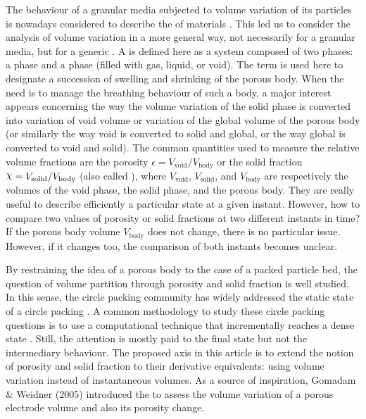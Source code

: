 \documentclass[11pt]{article}
\newcommand{\isay}[1]{\say{\textit{#1}}}
\newcommand{\Vbody}{V_{\text{body}}}
\newcommand{\Vsolid}{V_{\text{solid}}}
\newcommand{\Vvoid}{V_{\text{void}}}
\let\oldchi\chi
\renewcommand{\chi}{\raisebox{0.2ex}{$\oldchi$}}
\begin{document}
The behaviour of a granular media subjected to volume variation of its particles
is nowadays considered to describe the \isay{breathing} of materials
\cite{sassine_study_2018, gillia_hydride_2021, boivin_breathing_2024}. This led
us to consider the analysis of volume variation in a more general way, not
necessarily for a granular media, but for a generic . A
\isay{porous body} is defined here as a system composed of two phases: a
 phase and a  phase (filled with gas, liquid, or void). The
term \isay{breathing} is used here to designate a succession of swelling and
shrinking of the porous body. When the need is to manage the breathing behaviour
of such a body, a major interest appears concerning the way the volume variation
of the solid phase is converted into variation of void volume or variation of
the global volume of the porous body (or similarly the way void is converted to
solid and global, or the way global is converted to void and solid). The common
quantities used to measure the relative volume fractions are the porosity
$\epsilon = \Vvoid / \Vbody$ or the solid fraction $\chi = \Vsolid / \Vbody$
(also called ), where $\Vvoid$, $\Vsolid$, and $\Vbody$ are
respectively the volumes of the void phase, the solid phase, and the porous 
body. They are really useful to describe efficiently a particular state at a 
given instant. However, how to compare two values of porosity or solid 
fractions at two different instants in time? If the porous body volume $\Vbody$ 
does not change, there is no particular issue. However, if it changes too, the 
comparison of both instants becomes unclear.

By restraining the idea of a porous body to the case of a packed particle bed,
the question of volume partition through porosity and solid fraction is well
studied. In this sense, the circle packing community has widely addressed the
static state of a circle packing \cite{cumberland_packing_1987,
bowers_introduction_2008, hifi_literature_2009}. A common methodology to study
these circle packing questions is to use a computational 
technique that incrementally reaches a dense state
\cite{lubachevsky_minimum_2009, specht_high_2013, markot_improved_2021,
amore_circle_2023}. Still, the attention is mostly paid to the final state but
not the intermediary behaviour. The proposed axis in this article is to extend
the notion of porosity and solid fraction to their derivative equivalents: using
volume variation instead of instantaneous volumes. As a source of inspiration,
Gomadam \& Weidner (2005) \cite{gomadam_modeling_2005} introduced the
\isay{swelling coefficient} to assess the volume variation of a porous electrode
volume and also its porosity change.
\end{document}
